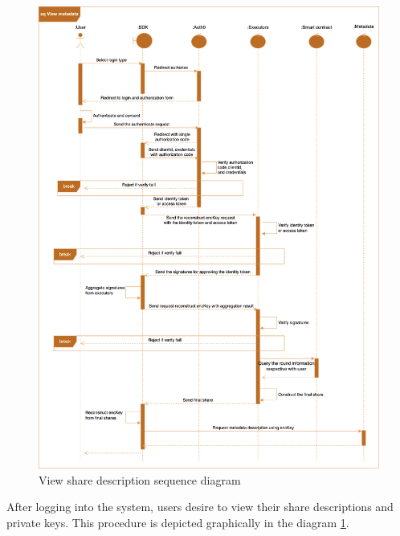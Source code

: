 \documentclass[../Main.tex]{subfiles}
\begin{document}
\begin{figure}[H]
 \centering
 \includegraphics[scale=0.14]{Figure/view-sequence-diagram.png}
 \caption{View share description sequence diagram}
    \label{fig:view-sequence-diagram}
\end{figure}
After logging into the system, users desire to view their share descriptions and private keys. This procedure is depicted graphically in the diagram \ref{fig:view-sequence-diagram}.
\end{document}
